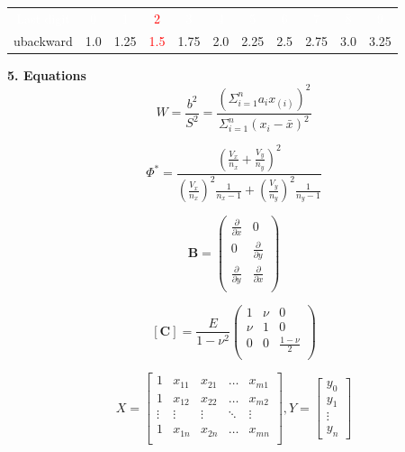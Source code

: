 \documentclass[10pt]{article} %
\begin{document}
\begin{table}[H]
\begin{tabular}{|c|c|c|c|c|c|c|c|c|c|c|}
\hline
\rowcolor[gray]{0.0}
\textcolor{white}{Last digit}&\textcolor{white}{0}&\textcolor{white}{1}&\textcolor{red}{2}&\textcolor{white}{3}&\textcolor{white}{4}&\textcolor{white}{5}
&\textcolor{white}{6}&\textcolor{white}{7}&\textcolor{white}{8}&\textcolor{white}{9}\\
\rowcolor[gray]{0.8}
ubackward&1.0&1.25&\textcolor{red}{1.5}&1.75&2.0&2.25&2.5&2.75&3.0&3.25\\
\hline
\end{tabular}
\end{table}


\textbf{5. Equations}
$$
W = \frac{b^2}{S^2} = \frac{(\Sigma_{i=1}^{n}a_i x_{(i)})^2}{\Sigma_{i=1}^n(x_i - \bar{x})^2}
$$

$$
\Phi^{\ast} = \frac{(\frac{V_x}{n_x} + \frac{V_y}{n_y})^2}{(\frac{V_x}{n_x})^2\frac{1}{n_x -1} + (\frac{V_y}{n_y})^2\frac{1}{n_y -1}}
$$

$$\mathbf{B}=
\left(
\begin{array}{ccc}
\frac{\partial}{\partial x} & 0 \\
0 & \frac{\partial}{\partial y} \\
\frac{\partial}{\partial y} & \frac{\partial}{\partial x} \\
\end{array}
\right)
$$


$$
[\mathbf{C}]= \frac{E}{1-\nu^2}
\left(
\begin{array}{ccc}
1 & \nu & 0 \\
\nu & 1 & 0 \\
0 & 0 & \frac{1-\nu}{2} \\
\end{array}
\right)
$$

\begin{equation}
X = \begin{bmatrix}
1 & x_{11} & x_{21} & \ldots & x_{m1}\\
1 & x_{12} & x_{22} & \ldots & x_{m2}\\
\vdots & \vdots & \vdots & \ddots & \vdots\\
1 & x_{1n} & x_{2n} & \ldots & x_{mn}\\
\end{bmatrix},
Y = \begin{bmatrix}
y_0\\
y_1\\
\vdots\\
y_n
\end{bmatrix}
\end{equation}
\end{document}
